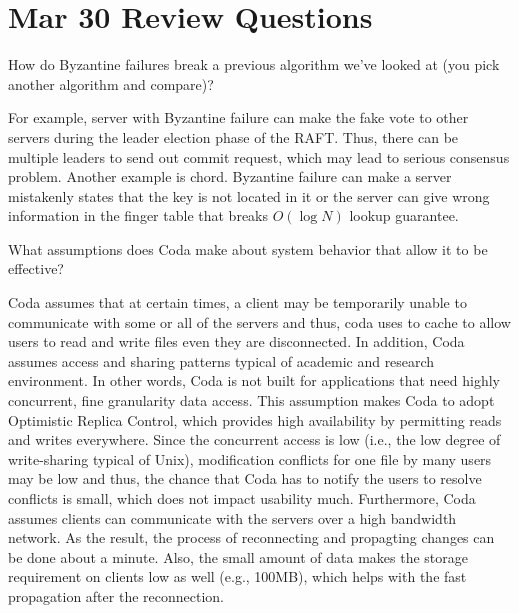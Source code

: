\section{Mar 30 Review Questions}
\begin{QandA}
   \item How do Byzantine failures break a previous algorithm we've looked at (you pick another algorithm and compare)?
         \begin{answered}
         For example, server with Byzantine failure can make the fake vote to other servers during the leader election phase of the RAFT.
         Thus, there can be multiple leaders to send out commit request, which may lead to serious consensus problem. Another
         example is chord. Byzantine failure can make a server mistakenly states that the key is not located in it or the server
         can give wrong information in the finger table that breaks $O(\log N)$ lookup guarantee.
         \end{answered}

   \item  What assumptions does Coda make about system behavior that allow it to be effective?
         \begin{answered}
         Coda assumes that at certain times, a client may be temporarily unable to communicate with some or all
         of the servers and thus, coda uses to cache to allow users to read and write files even they are disconnected.
         In addition, Coda assumes access and sharing patterns typical of academic and research environment. In other words,
         Coda is not built for applications that need highly concurrent, fine granularity data access. This assumption
         makes Coda to adopt Optimistic Replica Control, which provides high availability by permitting reads and writes 
         everywhere. Since the concurrent access is low (i.e., the low degree of write-sharing typical of Unix), modification
         conflicts for one file by many users may be low and thus, the chance that Coda has to notify the users to resolve
         conflicts is small, which does not impact usability much. 
		 Furthermore, Coda assumes clients can communicate with the servers over a high bandwidth network. As the result, the 
		 process of reconnecting and propagting changes can be done about a minute. Also, the small amount of data makes
		 the storage requirement on clients low as well (e.g., 100MB), which helps with the fast propagation after the reconnection.
         \end{answered}
\end{QandA}




